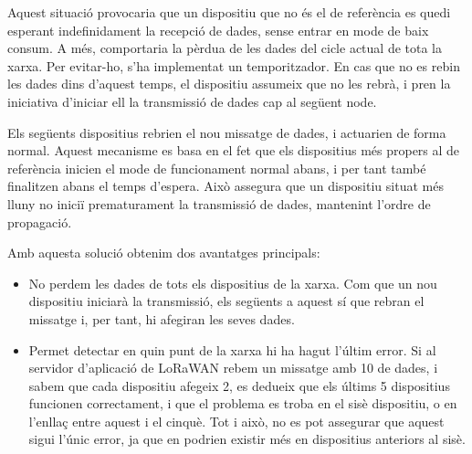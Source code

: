 \documentclass{tfgitic}[2024/07/01]
\begin{document}
{Aquest situació provocaria que un dispositiu que no és el de referència es quedi esperant indefinidament la recepció de dades, sense entrar en mode de baix consum. A més, comportaria la pèrdua de les dades del cicle actual de tota la xarxa. Per evitar-ho, s'ha implementat un temporitzador. En cas que no es rebin les dades dins d'aquest temps, el dispositiu assumeix que no les rebrà, i pren la iniciativa d'iniciar ell la transmissió de dades cap al següent node.

Els següents dispositius rebrien el nou missatge de dades, i actuarien de forma normal. Aquest mecanisme es basa en el fet que els dispositius més propers al de referència inicien el mode de funcionament normal abans, i per tant també finalitzen abans el temps d'espera. Això assegura que un dispositiu situat més lluny no iniciï prematurament la transmissió de dades, mantenint l'ordre de propagació.

Amb aquesta solució obtenim dos avantatges principals:
\begin{itemize}
    \item No perdem les dades de tots els dispositius de la xarxa. Com que un nou dispositiu iniciarà la transmissió, els següents a aquest sí que rebran el missatge i, per tant, hi afegiran les seves dades. 
    \item Permet detectar en quin punt de la xarxa hi ha hagut l'últim error. Si al servidor d'aplicació de LoRaWAN rebem un missatge amb \SI{10}{\byte} de dades, i sabem que cada dispositiu afegeix \SI{2}{\byte}, es dedueix que els últims 5 dispositius funcionen correctament, i que el problema es troba en el sisè dispositiu, o en l'enllaç entre aquest i el cinquè. Tot i això, no es pot assegurar que aquest sigui l'únic error, ja que en podrien existir més en dispositius anteriors al sisè.  
\end{itemize}

}
\end{document}
